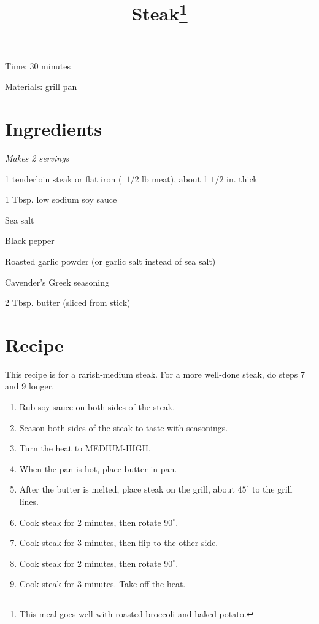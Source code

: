 \documentclass{article}
\title{Steak\footnote{This meal goes well with roasted broccoli and baked potato.}}
\begin{document}
Time: 30 minutes

Materials: grill pan

\section{Ingredients}
\textit{Makes 2 servings}

1 tenderloin steak or flat iron (~$1/2$ lb meat), about 1 $1/2$ in. thick

1 Tbsp. low sodium soy sauce

Sea salt

Black pepper

Roasted garlic powder (or garlic salt instead of sea salt)

Cavender's Greek seasoning

2 Tbsp. butter (sliced from stick)

\section{Recipe}
This recipe is for a rarish-medium steak. For a more well-done steak,
do steps 7 and 9 longer.
\begin{enumerate}
\item{Rub soy sauce on both sides of the steak.}
\item{Season both sides of the steak to taste with seasonings.}
\item{Turn the heat to MEDIUM-HIGH.}
\item{When the pan is hot, place butter in pan.}
\item{After the butter is melted, place steak on the grill, about $45^{\circ}$ to the grill lines.}
\item{Cook steak for 2 minutes, then rotate $90^{\circ}$.}
\item{Cook steak for 3 minutes, then flip to the other side.}
\item{Cook steak for 2 minutes, then rotate $90^{\circ}$.}
\item{Cook steak for 3 minutes. Take off the heat.}
\end{enumerate}
\end{document}
